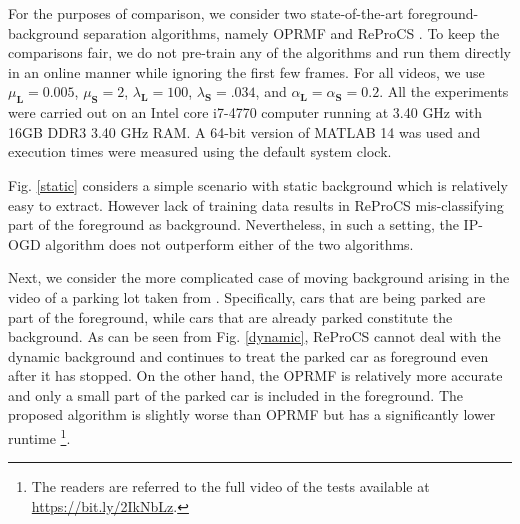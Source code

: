 \documentclass[draftcls,onecolumn,12pt]{IEEEtran}
\theoremstyle{plain}
\def\L{\mathbf{L}}
\def\S{\mathbf{S}}
\theoremstyle{plain}
\theoremstyle{remark}
\begin{document}
For the purposes of comparison, we consider two state-of-the-art foreground-background separation algorithms, namely OPRMF \cite{wang2012probabilistic} and ReProCS \cite{reprocs}. To keep the comparisons fair, we do not pre-train any of the algorithms and run them directly in an online manner while ignoring the first few frames. For all videos, we use $\mu_{\L}=0.005$, $\mu_{\S}=2$, $\lambda_{\L}=100$,  $\lambda_{\S}=.034$, and $\alpha_{\L}=\alpha_{\S}=0.2 $. All the experiments were  carried out on an Intel core i7-4770 computer running at 3.40 GHz with 16GB DDR3 3.40 GHz RAM. A 64-bit version of MATLAB 14 was used and execution times were measured using the default system clock.


Fig. \ref{static} considers a simple scenario with static background which is relatively easy to extract. However lack of training data results in ReProCS mis-classifying part of the foreground as background. Nevertheless, in such a setting, the IP-OGD algorithm does not outperform either of the two algorithms. 

Next, we consider the more complicated case of moving background arising in the video of a parking lot taken from \cite{virat}. Specifically, cars that are being parked are part of the foreground, while cars that are already parked constitute the background. As can be seen from Fig. \ref{dynamic}, ReProCS cannot deal with the dynamic background and continues to treat the parked car as foreground even after it has stopped. On the other hand, the OPRMF is relatively more accurate and only a small part of the parked car is included in the foreground. The proposed algorithm is slightly worse than OPRMF but has a significantly lower runtime \footnote{The readers are referred to the full video of the tests available at \url{https://bit.ly/2IkNbLz}.}.





\end{document}
